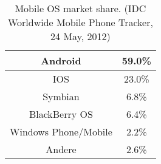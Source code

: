 \begin{table}[ht]
\begin{tabular}{|c|c|} \hline
	Android 				& 59.0\%	\\ \hline
	IOS						& 23.0\%	\\ \hline
	Symbian 				& 6.8\%	\\ \hline
	BlackBerry OS 			& 6.4\%	\\ \hline
	Windows Phone/Mobile 	& 2.2\%	\\ \hline
	Andere 					& 2.6\%	\\ \hline
\end{tabular}
	\caption{Mobile OS market share. (IDC Worldwide Mobile Phone Tracker, 24 May, 2012)}
	\label{tab:OS}
\end{table}